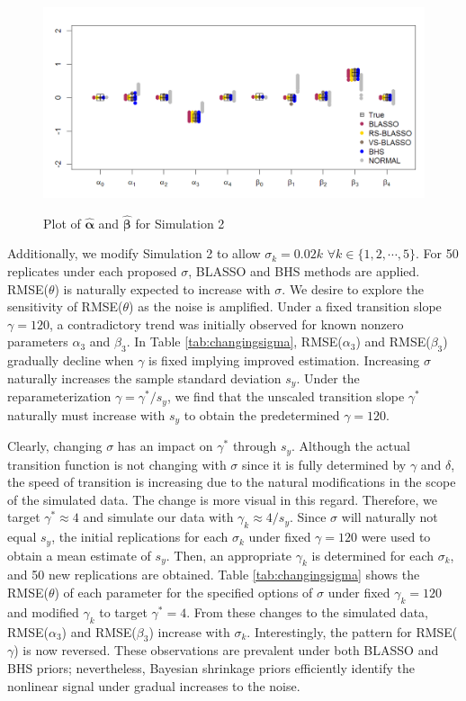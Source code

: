 \begin{figure}[h]
	\centering
	      \caption{Plot of $\hat{\bm{\alpha}}$ and $\hat{\bm{\beta}}$ for Simulation 2}
      \includegraphics[scale=0.3]{blassovsbhs3}
      \label{fig:blvsbh3}
\end{figure}

Additionally, we modify Simulation 2 to allow $\sigma_k=0.02k$ $\forall k \in \{1,2,\cdots, 5\}$. For 50 replicates under each proposed $\sigma$, BLASSO and BHS methods are applied.  RMSE($\theta$) is naturally expected to increase with $\sigma$. We desire to explore the sensitivity of RMSE($\theta$) as the noise is amplified. Under a fixed transition slope $\gamma=120$,  a contradictory trend was initially observed for known nonzero parameters $\alpha_3$ and $\beta_3$.  In Table \ref{tab:changingsigma}, RMSE($\alpha_3$) and RMSE($\beta_3$) gradually decline when $\gamma$ is fixed implying improved estimation. Increasing $\sigma$ naturally increases the sample standard deviation $s_{y}$. Under the reparameterization $\gamma=\gamma^*/s_y$, we find that the unscaled transition slope $\gamma^*$ naturally must increase with $s_y$ to obtain the predetermined $\gamma=120$. 

Clearly, changing $\sigma$ has an impact on $\gamma^*$ through $s_y$. Although the actual transition function is not changing with $\sigma$ since it is fully determined by $\gamma$ and $\delta$, the speed of transition is increasing due to the natural modifications in the scope of the simulated data. The change is more visual in this regard. Therefore, we target $\gamma^*\approx 4$ and simulate our data with $\gamma_k \approx 4/s_y$. Since $\sigma$ will naturally not equal $s_y$, the initial replications for each $\sigma_k$ under fixed $\gamma=120$ were used to obtain a mean estimate of $s_y$. Then, an appropriate $\gamma_k$ is determined for each $\sigma_k$, and 50 new replications are obtained. Table \ref{tab:changingsigma} shows the RMSE($\theta$) of each parameter for the specified options of $\sigma$ under fixed $\gamma_k=120$ and modified $\gamma_k$ to target $\gamma^*=4$. From these changes to the simulated data, RMSE($\alpha_3$) and RMSE($\beta_3$) increase with $\sigma_k$. Interestingly, the pattern for RMSE($\gamma$) is now reversed. These observations are  prevalent under both BLASSO and BHS priors; nevertheless, Bayesian shrinkage priors efficiently identify the nonlinear signal under gradual increases to the noise.




